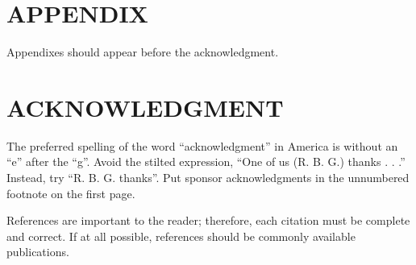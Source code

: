 \documentclass[letterpaper, 10 pt, conference]{ieeeconf}  %
\begin{document}
\section*{APPENDIX}

Appendixes should appear before the acknowledgment.

\section*{ACKNOWLEDGMENT}

The preferred spelling of the word ``acknowledgment'' in America is without an ``e'' after the ``g''. Avoid the stilted expression, ``One of us (R. B. G.) thanks . . .''  Instead, try ``R. B. G. thanks''. Put sponsor acknowledgments in the unnumbered footnote on the first page.




References are important to the reader; therefore, each citation must be complete and correct. If at all possible, references should be commonly available publications.
\end{document}
